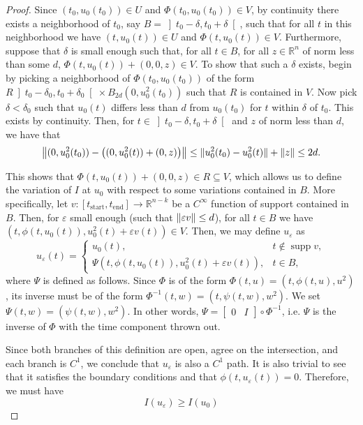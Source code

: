 \documentclass{article}
\theoremstyle{plain}
\theoremstyle{nonumberplain}
\newtheorem{proof}{Proof}
\newcommand{\R}{\mathbb{R}}
\newcommand{\tstart}{\mathrm{start}}
\newcommand{\tend}{\mathrm{end}}
\DeclarePairedDelimiter\norm{\lVert}{\rVert}
\DeclareMathOperator{\supp}{supp}
\begin{document}
\begin{proof}
Since $(t_0, u_0(t_0)) \in U$ and $\Phi(t_0, u_0(t_0)) \in V$, by continuity there exists a neighborhood of $t_0$, say $B = \left]t_0 - \delta, t_0 + \delta\right[$, such that for all $t$ in this neighborhood we have $(t,u_0(t)) \in U$ and $\Phi(t,u_0(t)) \in V$. Furthermore, suppose that $\delta$ is small enough such that, for all $t \in B$, for all $z \in \R^{n}$ of norm less than some $d$, $\Phi(t,u_0(t)) + (0,0,z) \in V$. To show that such a $\delta$ exists, begin by picking a neighborhood of $\Phi(t_0, u_0(t_0))$ of the form $R \left]t_0-\delta_0, t_0 + \delta_0\right[ \times B_{2d}(0, u_0^2(t_0))$ such that $R$ is contained in $V$. Now pick $\delta < \delta_0$ such that $u_0(t)$ differs less than $d$ from $u_0(t_0)$ for $t$ within $\delta$ of $t_0$. This exists by continuity. Then, for $t \in \left]t_0-\delta, t_0 + \delta\right[$ and $z$ of norm less than $d$, we have that
\[\norm*{(0, u_0^2(t_0)) - \left((0, u_0^2(t)) + (0, z)\right)} \leq \norm{u_0^2(t_0) - u_0^2(t)} + \norm z \leq 2d.\]

This shows that $\Phi(t,u_0(t)) + (0,0,z) \in R \subseteq V$, which allows us to define the variation of $I$ at $u_0$ with respect to some variations contained in $B$. More specifically, let $v : [t_\tstart, t_\tend] \to \R^{n-k}$ be a $C^\infty$ function of support contained in $B$. Then, for $\varepsilon$ small enough (such that $\norm{\varepsilon v} \leq d$), for all $t \in B$ we have $(t, \phi(t,u_0(t)), u_0^2(t) + \varepsilon v(t)) \in V$. Then, we may define $u_\varepsilon$ as
\[
u_\varepsilon(t) =
\begin{cases}
u_0(t), & t \not \in \supp v,\\
\Psi(t, \phi(t,u_0(t)), u_0^2(t) + \varepsilon v(t)), & t \in B,
\end{cases}
\]
where $\Psi$ is defined as follows. Since $\Phi$ is of the form $\Phi(t,u) = (t, \phi(t,u), u^2)$, its inverse must be of the form $\Phi^{-1}(t,w) = (t, \psi(t,w), w^2)$. We set $\Psi(t,w) = (\psi(t,w), w^2)$. In other words, $\Psi = \begin{bmatrix} 0 & I \end{bmatrix} \circ \Phi^{-1}$, i.e. $\Psi$ is the inverse of $\Phi$ with the time component thrown out.

Since both branches of this definition are open, agree on the intersection, and each branch is $C^1$, we conclude that $u_\varepsilon$ is also a $C^1$ path. It is also trivial to see that it satisfies the boundary conditions and that $\phi(t, u_\varepsilon(t)) = 0$. Therefore, we must have
\[I(u_\varepsilon) \geq I(u_0)\]


\end{proof}
\end{document}

